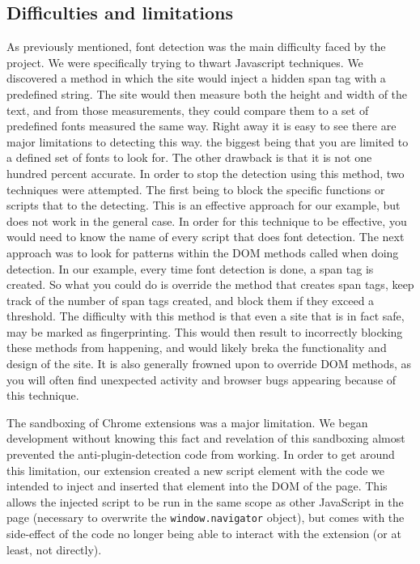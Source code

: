 \documentclass[12pt,a4paper]{article}
\begin{document}
\subsection{Difficulties and limitations}
As previously mentioned, font detection was the main difficulty faced by the project. We were specifically trying to thwart Javascript techniques. We discovered a method\cite{fontdetection} in which the site would inject a hidden span tag with a predefined string. The site would then measure both the height and width of the text, and from those measurements, they could compare them to a set of predefined fonts measured the same way. Right away it is easy to see there are major limitations to detecting this way. the biggest being that you are limited to a defined set of fonts to look for. The other drawback is that it is not one hundred percent accurate. In order to stop the detection using this method, two techniques were attempted. The first being to block the specific functions or scripts that to the detecting. This is an effective approach for our example, but does not work in the general case. In order for this technique to be effective, you would need to know the name of every script that does font detection. The next approach was to look for patterns within the DOM methods called when doing detection. In our example, every time font detection is done, a span tag is created. So what you could do is override the method that creates span tags, keep track of the number of span tags created, and block them if they exceed a threshold. The difficulty with this method is that even a site that is in fact safe, may be marked as fingerprinting. This would then result to incorrectly blocking these methods from happening, and would likely breka the functionality and design of the site. It is also generally frowned upon to override DOM methods, as you will often find unexpected activity and browser bugs appearing because of this technique.    

The sandboxing of Chrome extensions was a major limitation. We began development without knowing this fact and revelation of this sandboxing almost prevented the anti-plugin-detection code from working. In order to get around this limitation, our extension created a new script element with the code we intended to inject and inserted that element into the DOM of the page. This allows the injected script to be run in the same scope as other JavaScript in the page (necessary to overwrite the \texttt{window.navigator} object), but comes with the side-effect of the code no longer being able to interact with the extension (or at least, not directly).
\end{document}

